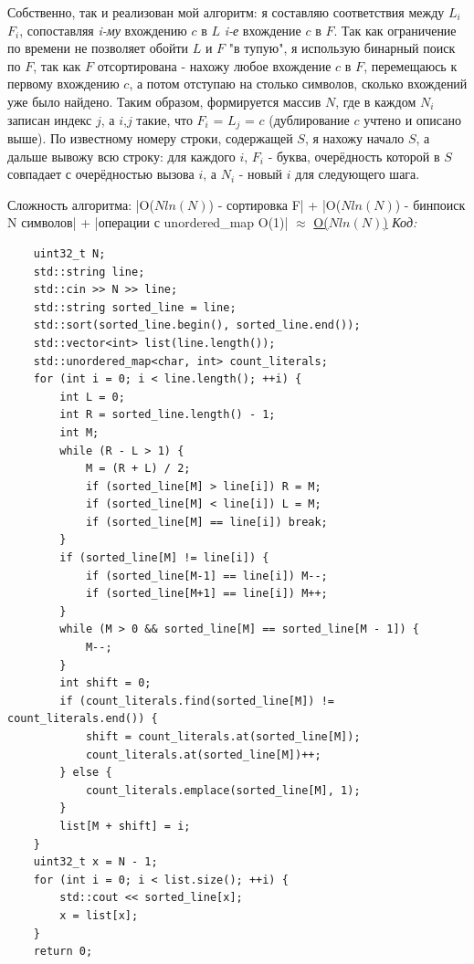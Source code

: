 Собственно, так и реализован мой алгоритм: я составляю соответствия между $L_i$$F_i$, сопоставляя \textit{i-му} вхождению $c$ в $L$
\textit{i-е} вхождение $c$ в $F$. Так как ограничение по времени не позволяет обойти $L$ и $F$ "в тупую", я использую бинарный поиск
по $F$, так как $F$ отсортирована - нахожу любое вхождение $c$ в $F$, перемещаюсь к первому вхождению $c$, а потом отступаю на
столько символов, сколько вхождений уже было найдено. Таким образом, формируется массив $N$, где в каждом $N_i$ записан
индекс $j$, а $i$,$j$ такие, что $F_i$ = $L_j$ = $c$ (дублирование $c$ учтено и описано выше). По известному номеру строки,
содержащей $S$, я нахожу начало $S$, а дальше вывожу всю строку: для каждого $i$, $F_i$ - буква, очерёдность которой в $S$ совпадает с
очерёдностью вызова $i$, а $N_i$ - новый $i$ для следующего шага.\par
Сложность алгоритма: |O($Nln(N)$) - сортировка F| + |O($Nln(N)$) - бинпоиск N символов| + |операции с unordered\_map O(1)| $\approx$ \underline{O($Nln(N)$)}
\BgThispage
\newpage
\textit{Код:}
\small
\begin{center}
    \begin{verbatim}
    uint32_t N;
    std::string line;
    std::cin >> N >> line;
    std::string sorted_line = line;
    std::sort(sorted_line.begin(), sorted_line.end());
    std::vector<int> list(line.length());
    std::unordered_map<char, int> count_literals;
    for (int i = 0; i < line.length(); ++i) {
        int L = 0;
        int R = sorted_line.length() - 1;
        int M;
        while (R - L > 1) {
            M = (R + L) / 2;
            if (sorted_line[M] > line[i]) R = M;
            if (sorted_line[M] < line[i]) L = M;
            if (sorted_line[M] == line[i]) break;
        }
        if (sorted_line[M] != line[i]) {
            if (sorted_line[M-1] == line[i]) M--;
            if (sorted_line[M+1] == line[i]) M++;
        }
        while (M > 0 && sorted_line[M] == sorted_line[M - 1]) {
            M--;
        }
        int shift = 0;
        if (count_literals.find(sorted_line[M]) != count_literals.end()) {
            shift = count_literals.at(sorted_line[M]);
            count_literals.at(sorted_line[M])++;
        } else {
            count_literals.emplace(sorted_line[M], 1);
        }
        list[M + shift] = i;
    }
    uint32_t x = N - 1;
    for (int i = 0; i < list.size(); ++i) {
        std::cout << sorted_line[x];
        x = list[x];
    }
    return 0;
    \end{verbatim}
\end{center}
\normalsize
\BgThispage
\newpage


